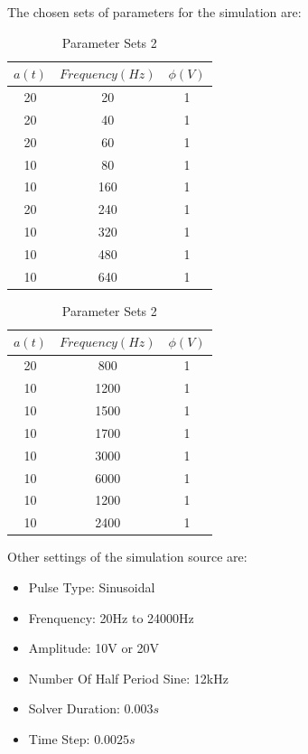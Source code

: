 \documentclass[letterpaper,12pt]{article}
\begin{document}
\noindent The chosen sets of parameters for the simulation are:
\begin{table}[H]
    \centering
    \scriptsize
    \begin{minipage}[t]{0.45\textwidth}
    \centering
    \begin{tabular}{|c|c|c|}
    \toprule
    \textbf{$a(t)$} & \textbf{$Frequency (Hz)$} & \textbf{$\phi (V)$} \\
    \midrule
    20 & 20   & 1 \\
    20 & 40   & 1 \\
    20 & 60   & 1 \\
    10 & 80   & 1 \\
    10 & 160  & 1 \\
    20 & 240  & 1 \\
    10 & 320  & 1 \\
    10 & 480  & 1 \\
    10 & 640  & 1 \\
    \bottomrule
    \end{tabular}
    \caption{Parameter Sets 1}
    \end{minipage}\hfill
    \begin{minipage}[t]{0.45\textwidth}
    \centering
    \begin{tabular}{|c|c|c|}
    \toprule
    \textbf{$a(t)$} & \textbf{$Frequency (Hz)$} & \textbf{$\phi (V)$} \\
    \midrule
    20 & 800  & 1 \\
    10 & 1200 & 1 \\
    10 & 1500 & 1 \\
    10 & 1700 & 1 \\
    10 & 3000 & 1 \\
    10 & 6000 & 1 \\
    10 & 1200 & 1 \\
    10 & 2400 & 1 \\
    \bottomrule
    \end{tabular}
    \caption{Parameter Sets 2}
    \end{minipage}
\end{table}
\noindent Other settings of the simulation source are:
\begin{multicols}{2}
\begin{itemize}
    \item Pulse Type: Sinusoidal
    \item Frenquency: 20Hz to 24000Hz
    \item Amplitude: 10V or 20V
    \item Number Of Half Period Sine: 12kHz
    \item Solver Duration: $0.003s$
    \item Time Step: $0.0025s$
\end{itemize}
\end{multicols}
\end{document}
